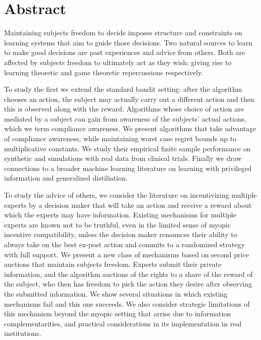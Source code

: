 \chapter*{Abstract}
\vspace{-1em}


Maintaining subjects freedom to decide imposes structure and constraints on learning systems that aim to guide those decisions. Two natural sources to learn to make good decisions are past experiences and advice from others. Both are affected by subjects freedom to ultimately act as they wish; giving rise to learning theoretic and game theoretic repercussions respectively.

To study the first we extend the standard bandit setting: after the algorithm chooses an action, the subject may actually carry out a different action and then this is observed along with the reward. Algorithms whose choice of action are mediated by a subject can gain from awareness of the subjects' actual actions, which we term compliance awareness. We present algorithms that take advantage of compliance awareness, while maintaining worst case regret bounds up to multiplicative constants.  We study their empirical finite sample performance on synthetic and simulations with real data from clinical trials. Finally we draw connections to a broader machine learning literature on learning with privileged information and generalized distiliation.  

To study the advice of others, we consider the literature on incentivizing multiple experts by a decision maker that will take an action and receive a reward about which the experts may have information. Existing mechanisms for multiple experts are known not to be truthful, even in the limited sense of myopic incentive compatibility, unless the decision maker renounces their ability to always take on the best ex-post action and commits to a randomized strategy with full support. We present a new class of mechanisms based on second price auctions that maintain subjects freedom. Experts submit their private information, and the algorithm auctions of the rights to a share of the reward of the subject, who then has freedom to pick the action they desire after observing the submitted information. We show several situations in which existing mechanisms fail and this one succeeds. We also consider strategic limitations of this mechanism beyond the myopic setting that arrise due to information complementarities, and practical considerations in its implementation in real institutions.



